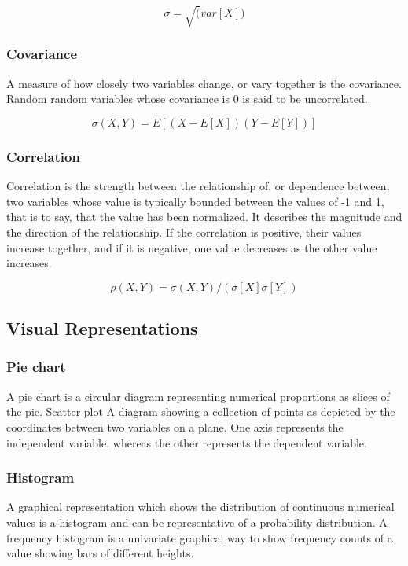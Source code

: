 \documentclass[11pt,]{article}
\begin{document}
\[ \sigma = \sqrt(var[X]) \]

\subsubsection{Covariance}\label{covariance}

A measure of how closely two variables change, or vary together is the
covariance. Random random variables whose covariance is 0 is said to be
uncorrelated.

\[ \sigma(X, Y) = E[(X - E[X])(Y-E[Y])] \]

\subsubsection{Correlation}\label{correlation}

Correlation is the strength between the relationship of, or dependence
between, two variables whose value is typically bounded between the
values of -1 and 1, that is to say, that the value has been normalized.
It describes the magnitude and the direction of the relationship. If the
correlation is positive, their values increase together, and if it is
negative, one value decreases as the other value increases.

\[ \rho(X, Y) = \sigma(X, Y) / (\sigma [X] \sigma [Y]) \]

\subsection{Visual Representations}\label{visual-representations}

\subsubsection{Pie chart}\label{pie-chart}

A pie chart is a circular diagram representing numerical proportions as
slices of the pie. Scatter plot A diagram showing a collection of points
as depicted by the coordinates between two variables on a plane. One
axis represents the independent variable, whereas the other represents
the dependent variable.

\subsubsection{Histogram}\label{histogram}

A graphical representation which shows the distribution of continuous
numerical values is a histogram and can be representative of a
probability distribution. A frequency histogram is a univariate
graphical way to show frequency counts of a value showing bars of
different heights.
\end{document}
